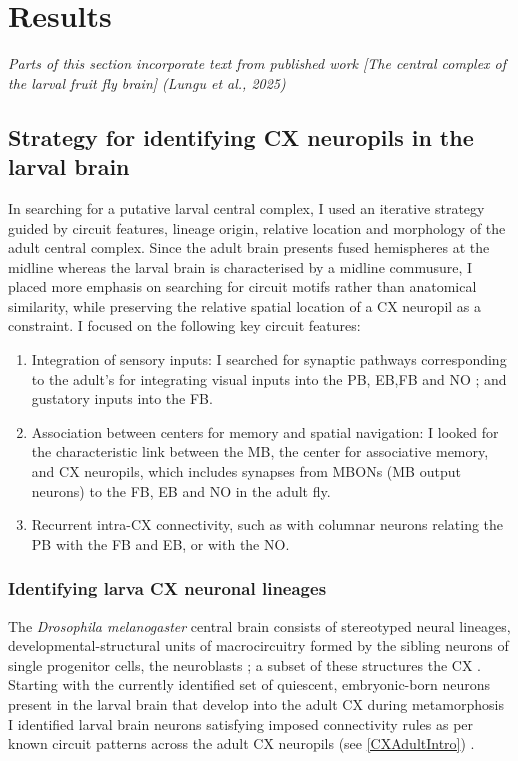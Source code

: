 
\chapter{Results}
\textit{Parts of this section incorporate text from published work [The central complex of the larval fruit fly brain] (Lungu et al., 2025)}


\section{Strategy for identifying CX neuropils in the larval brain}

    In searching for a putative larval central complex, I used an iterative strategy guided by circuit features, lineage origin, relative location and morphology of the adult central complex. Since the adult brain presents fused hemispheres at the midline whereas the larval brain is characterised by a midline commusure, I placed more emphasis on searching for circuit motifs rather than anatomical similarity,  while preserving the relative spatial location of a CX neuropil as a constraint.  I focused on the following key circuit features:
    \begin{enumerate}
    \item Integration of sensory inputs: I searched for synaptic pathways corresponding to the adult's for integrating visual inputs into the PB, EB,FB and NO \citep{hulse2021connectome}; and gustatory inputs into the FB.
    \item Association between centers for memory and spatial navigation: I looked for the characteristic link between the MB, the center for associative memory, and CX neuropils, which includes synapses from MBONs (MB output neurons) to the FB, EB and NO in the adult fly.
    \item Recurrent intra-CX connectivity, such as with columnar neurons relating the PB with the FB and EB, or with the NO.
    \end{enumerate}
    
    \subsection{Identifying larva CX neuronal lineages }
    The \textit{Drosophila melanogaster} central brain consists of stereotyped neural lineages, developmental-structural units of macrocircuitry formed by the sibling neurons of single progenitor cells, the neuroblasts \citep{Spindler2010Lineages}; a subset of these structures the CX \citep{Pereanu2011LineagesCX}. Starting with the currently identified set of quiescent, embryonic-born neurons present in the larval brain that develop into the adult CX during metamorphosis~\citep{andrade2019developmentally}
    I identified larval brain neurons satisfying imposed connectivity rules as per known circuit patterns across the adult CX neuropils \citep{wolff2015neuroarchitecture, wolff2018neuroarchitecture, franconville2018building, hulse2021connectome} (see \ref{CXAdultIntro}) .
    
